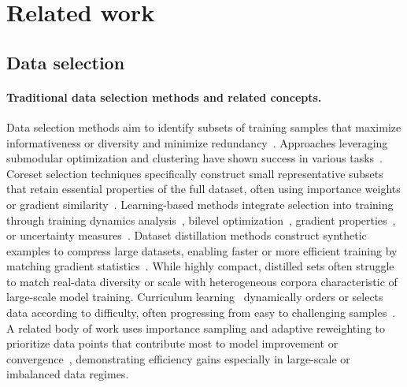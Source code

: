 \section{Related work} 
\subsection{Data selection}
\paragraph{Traditional data selection methods and related concepts.}  
Data selection methods aim to identify subsets of training samples that maximize informativeness or diversity and minimize redundancy~\cite{ds_albalak2022survey}. Approaches leveraging submodular optimization and clustering have shown success in various tasks~\citep{ds_submodular_mirzasoleiman2016fast, ds_cluster_sener2018active, ds_submodular_wei2015submodularity}. Coreset selection techniques specifically construct small representative subsets that retain essential properties of the full dataset, often using importance weights or gradient similarity~\citep{ds_killamsetty2021grad,ds_cluster_sener2018active}. Learning-based methods integrate selection into training through training dynamics analysis~\citep{ds_paul2021deep,ds_Toneva2018AnES}, bilevel optimization~\citep{ds_bi_Killamsetty2020GLISTERGB,ds_bi_zhou2022probabilistic}, gradient properties~\citep{ds_sample_Johnson2018TrainingDM,ds_sample_Katharopoulos2018NotAS}, or uncertainty measures~\citep{ds_uncertain_Ash2019DeepBA}. Dataset distillation methods construct synthetic examples to compress large datasets, enabling faster or more efficient training by matching gradient statistics~\citep{ds_distill_Cazenavette2022DatasetDB,ds_distill_Deng2022RememberTP,ds_distill_wang2018dataset,ds_distill_Yu2023DatasetDA}. While highly compact, distilled sets often struggle to match real-data diversity or scale with heterogeneous corpora characteristic of large-scale model training. Curriculum learning~\citep{cl_bengio2009curriculum} dynamically orders or selects data according to difficulty, often progressing from easy to challenging samples~\citep{cl_hacohen2019power, cl_Soviany2021CurriculumLA}. A related body of work uses importance sampling and adaptive reweighting to prioritize data points that contribute most to model improvement or convergence~\citep{is_alain2015variance, cl_bengio2009curriculum,is_Loshchilov2015OnlineBS}, demonstrating efficiency gains especially in large-scale or imbalanced data regimes.

